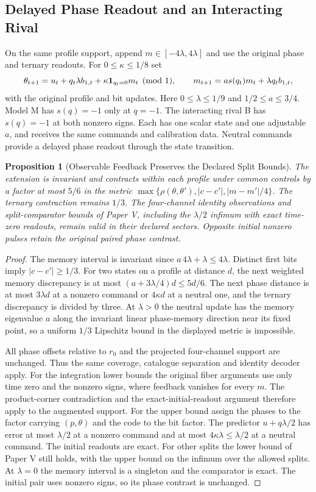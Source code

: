 \documentclass[11pt,a4paper]{article}
\newtheorem{proposition}{Proposition}[section]
\begin{document}
\subsection{Delayed Phase Readout and an Interacting Rival}

On the same profile support, append $m\in[-4\lambda,4\lambda]$ and use the original phase and ternary readouts. For $0\le\kappa\le1/8$ set
\[
 \theta_{t+1}=u_t+q_t\lambda b_{1,t}+\kappa{\bf1}_{q_t=0}m_t\pmod 1,
 \qquad m_{t+1}=a s(q_t)m_t+\lambda q_t b_{1,t},
\]
with the original profile and bit updates. Here $0\le\lambda\le1/9$ and $1/2\le a\le3/4$. Model M has $s(q)=-1$ only at $q=-1$. The interacting rival B has $s(q)=-1$ at both nonzero signs. Each has one scalar state and one adjustable $a$, and receives the same commands and calibration data. Neutral commands provide a delayed phase readout through the state transition.

\begin{proposition}[Observable Feedback Preserves the Declared Split Bounds]\label{prop:observable-feedback-split}
The extension is invariant and contracts within each profile under common controls by a factor at most $5/6$ in the metric $\max\{\rho(\theta,\theta'),|c-c'|,|m-m'|/4\}$. The ternary contraction remains $1/3$. The four-channel identity observations and split-comparator bounds of Paper V, including the $\lambda/2$ infimum with exact time-zero readouts, remain valid in their declared sectors. Opposite initial nonzero pulses retain the original paired phase contrast.
\end{proposition}
\begin{proof}
The memory interval is invariant since $a\,4\lambda+\lambda\le4\lambda$. Distinct first bits imply $|c-c'|\ge1/3$. For two states on a profile at distance $d$, the next weighted memory discrepancy is at most $(a+3\lambda/4)d\le5d/6$. The next phase distance is at most $3\lambda d$ at a nonzero command or $4\kappa d$ at a neutral one, and the ternary discrepancy is divided by three. At $\lambda>0$ the neutral update has the memory eigenvalue $a$ along the invariant linear phase-memory direction near its fixed point, so a uniform $1/3$ Lipschitz bound in the displayed metric is impossible.

All phase offsets relative to $r_0$ and the projected four-channel support are unchanged. Thus the same coverage, catalogue separation and identity decoder apply. For the integration lower bounds the original fiber arguments use only time zero and the nonzero signs, where feedback vanishes for every $m$. The product-corner contradiction and the exact-initial-readout argument therefore apply to the augmented support. For the upper bound assign the phases to the factor carrying $(p,\theta)$ and the code to the bit factor. The predictor $u+q\lambda/2$ has error at most $\lambda/2$ at a nonzero command and at most $4\kappa\lambda\le\lambda/2$ at a neutral command. The initial readouts are exact. For other splits the lower bound of Paper V still holds, with the upper bound on the infimum over the allowed splits. At $\lambda=0$ the memory interval is a singleton and the comparator is exact. The initial pair uses nonzero signs, so its phase contrast is unchanged.
\end{proof}
\end{document}
